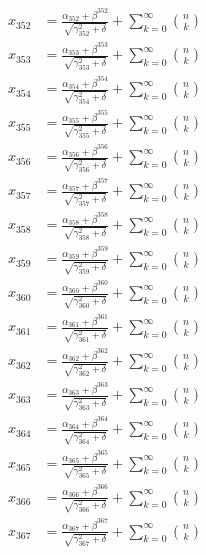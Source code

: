 \documentclass{article}
\begin{document}
\begin{align}
  x_{352} &= \frac{\alpha_{352} + \beta^{352}}{\sqrt{\gamma_{352}^2 + \delta}} + \sum_{k=0}^{\infty} \binom{n}{k} \label{eq:352} \\
  x_{353} &= \frac{\alpha_{353} + \beta^{353}}{\sqrt{\gamma_{353}^2 + \delta}} + \sum_{k=0}^{\infty} \binom{n}{k} \label{eq:353} \\
  x_{354} &= \frac{\alpha_{354} + \beta^{354}}{\sqrt{\gamma_{354}^2 + \delta}} + \sum_{k=0}^{\infty} \binom{n}{k} \label{eq:354} \\
  x_{355} &= \frac{\alpha_{355} + \beta^{355}}{\sqrt{\gamma_{355}^2 + \delta}} + \sum_{k=0}^{\infty} \binom{n}{k} \label{eq:355} \\
  x_{356} &= \frac{\alpha_{356} + \beta^{356}}{\sqrt{\gamma_{356}^2 + \delta}} + \sum_{k=0}^{\infty} \binom{n}{k} \label{eq:356} \\
  x_{357} &= \frac{\alpha_{357} + \beta^{357}}{\sqrt{\gamma_{357}^2 + \delta}} + \sum_{k=0}^{\infty} \binom{n}{k} \label{eq:357} \\
  x_{358} &= \frac{\alpha_{358} + \beta^{358}}{\sqrt{\gamma_{358}^2 + \delta}} + \sum_{k=0}^{\infty} \binom{n}{k} \label{eq:358} \\
  x_{359} &= \frac{\alpha_{359} + \beta^{359}}{\sqrt{\gamma_{359}^2 + \delta}} + \sum_{k=0}^{\infty} \binom{n}{k} \label{eq:359} \\
  x_{360} &= \frac{\alpha_{360} + \beta^{360}}{\sqrt{\gamma_{360}^2 + \delta}} + \sum_{k=0}^{\infty} \binom{n}{k} \label{eq:360} \\
  x_{361} &= \frac{\alpha_{361} + \beta^{361}}{\sqrt{\gamma_{361}^2 + \delta}} + \sum_{k=0}^{\infty} \binom{n}{k} \label{eq:361} \\
  x_{362} &= \frac{\alpha_{362} + \beta^{362}}{\sqrt{\gamma_{362}^2 + \delta}} + \sum_{k=0}^{\infty} \binom{n}{k} \label{eq:362} \\
  x_{363} &= \frac{\alpha_{363} + \beta^{363}}{\sqrt{\gamma_{363}^2 + \delta}} + \sum_{k=0}^{\infty} \binom{n}{k} \label{eq:363} \\
  x_{364} &= \frac{\alpha_{364} + \beta^{364}}{\sqrt{\gamma_{364}^2 + \delta}} + \sum_{k=0}^{\infty} \binom{n}{k} \label{eq:364} \\
  x_{365} &= \frac{\alpha_{365} + \beta^{365}}{\sqrt{\gamma_{365}^2 + \delta}} + \sum_{k=0}^{\infty} \binom{n}{k} \label{eq:365} \\
  x_{366} &= \frac{\alpha_{366} + \beta^{366}}{\sqrt{\gamma_{366}^2 + \delta}} + \sum_{k=0}^{\infty} \binom{n}{k} \label{eq:366} \\
  x_{367} &= \frac{\alpha_{367} + \beta^{367}}{\sqrt{\gamma_{367}^2 + \delta}} + \sum_{k=0}^{\infty} \binom{n}{k} \label{eq:367} \\

\end{align}
\end{document}
